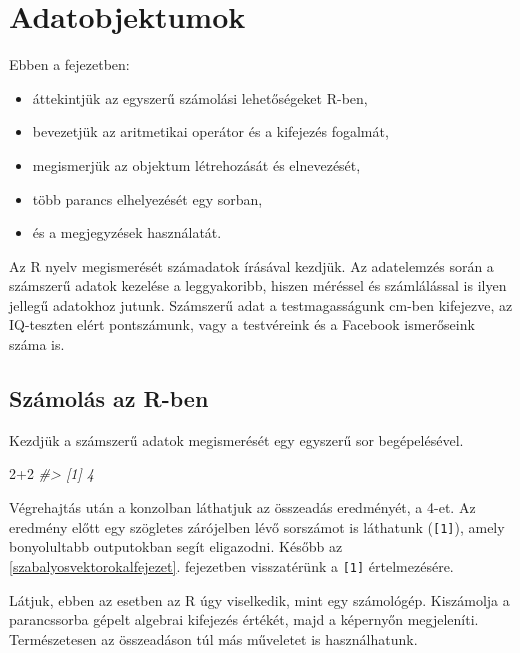 \documentclass[
]{book}
\makeatletter
\newenvironment{Shaded}{\begin{snugshade}}{\end{snugshade}}
\newcommand{\CommentTok}[1]{\textcolor[rgb]{0.56,0.35,0.01}{\textit{#1}}}
\newcommand{\DecValTok}[1]{\textcolor[rgb]{0.00,0.00,0.81}{#1}}
\newcommand{\SpecialCharTok}[1]{\textcolor[rgb]{0.00,0.00,0.00}{#1}}
\providecommand{\tightlist}{%
  \setlength{\itemsep}{0pt}\setlength{\parskip}{0pt}}
\newenvironment{kframe}{%
\medskip{}
\setlength{\fboxsep}{.8em}
 \def\at@end@of@kframe{}%
 \ifinner\ifhmode%
  \def\at@end@of@kframe{\end{minipage}}%
  \begin{minipage}{\columnwidth}%
 \fi\fi%
 \def\FrameCommand##1{\hskip\@totalleftmargin \hskip-\fboxsep
 \colorbox{shadecolor}{##1}\hskip-\fboxsep
     \hskip-\linewidth \hskip-\@totalleftmargin \hskip\columnwidth}%
 \MakeFramed {\advance\hsize-\width
   \@totalleftmargin\z@ \linewidth\hsize
   \@setminipage}}%
 {\par\unskip\endMakeFramed%
 \at@end@of@kframe}
\newenvironment{rmdblock}[1]
  {
  \begin{itemize}
  \renewcommand{\labelitemi}{
    \raisebox{-.7\height}[0pt][0pt]{
      {\setkeys{Gin}{width=3em,keepaspectratio}\texttt{[image: images/\#1]}}
    }
  }
  \setlength{\fboxsep}{1em}
  \begin{kframe}
  \item
  }
  {
  \end{kframe}
  \end{itemize}
  }
\newenvironment{rmdlevel1}
  {\begin{rmdblock}{level1}}
  {\end{rmdblock}}
\makeatother
\begin{document}
\hypertarget{adatobjektumok}{%
\section{Adatobjektumok}\label{adatobjektumok}}

\begin{rmdlevel1}
Ebben a fejezetben:

\begin{itemize}
\tightlist
\item
  áttekintjük az egyszerű számolási lehetőségeket R-ben,
\item
  bevezetjük az aritmetikai operátor és a kifejezés fogalmát,
\item
  megismerjük az objektum létrehozását és elnevezését,
\item
  több parancs elhelyezését egy sorban,
\item
  és a megjegyzések használatát.
\end{itemize}
\end{rmdlevel1}

Az R nyelv megismerését számadatok írásával kezdjük. Az adatelemzés során a számszerű adatok kezelése a leggyakoribb, hiszen méréssel és számlálással is ilyen jellegű adatokhoz jutunk. Számszerű adat a testmagasságunk cm-ben kifejezve, az IQ-teszten elért pontszámunk, vagy a testvéreink és a Facebook ismerőseink száma is.

\hypertarget{szuxe1moluxe1s-az-r-ben}{%
\subsection{Számolás az R-ben}\label{szuxe1moluxe1s-az-r-ben}}

Kezdjük a számszerű adatok megismerését egy egyszerű sor begépelésével.

\begin{Shaded}
\begin{Highlighting}[]
\DecValTok{2}\SpecialCharTok{+}\DecValTok{2} 
\CommentTok{\#\textgreater{} [1] 4}
\end{Highlighting}
\end{Shaded}

Végrehajtás után a konzolban láthatjuk az összeadás eredményét, a 4-et. Az eredmény előtt egy szögletes zárójelben lévő sorszámot is láthatunk (\texttt{{[}1{]}}), amely bonyolultabb outputokban segít eligazodni. Később az \ref{szabalyosvektorokalfejezet}. fejezetben visszatérünk a \texttt{{[}1{]}} értelmezésére.

Látjuk, ebben az esetben az R úgy viselkedik, mint egy számológép. Kiszámolja a parancssorba gépelt algebrai kifejezés értékét, majd a képernyőn megjeleníti. Természetesen az összeadáson túl más műveletet is használhatunk.
\end{document}
